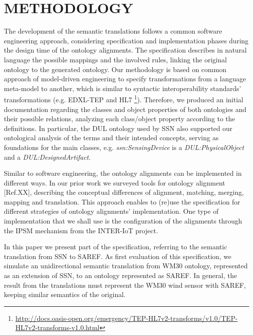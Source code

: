 \documentclass{sig-alternate-05-2015}
\begin{document}
\section{METHODOLOGY}
The development of the semantic translations follows a common software engineering approach, considering specification and implementation phases during the design time of the ontology alignments. The specification describes in natural language the possible mappings and the involved rules, linking the original ontology to the generated ontology. Our methodology is based on common approach of model-driven engineering to specify transformations from a language meta-model to another, which is similar to syntactic interoperability standards' transformations (e.g. EDXL-TEP and HL7 \footnote{\url{http://docs.oasis-open.org/emergency/TEP-HL7v2-transforms/v1.0/TEP-HL7v2-transforms-v1.0.html}}). Therefore, we produced an initial documentation regarding the classes and object properties of both ontologies and their possible relations, analyzing each class/object property according to the definitions. In particular, the DUL ontology used by SSN also supported our ontological analysis of the terms and their intended concepts, serving as foundations for the main classes, e.g. \textit{ssn:SensingDevice} is a \textit{DUL:PhysicalObject} and a \textit{DUL:DesignedArtifact}.

Similar to software engineering, the ontology alignments can be implemented in different ways. In our prior work we surveyed tools for ontology alignment [Ref.XX], describing the conceptual differences of alignment, matching, merging, mapping and translation. This approach enables to (re)use the specification for different strategies of ontology alignments’ implementation. One type of implementation that we shall use is the configuration of the alignments through the IPSM mechanism from the INTER-IoT project. 

In this paper we present part of the specification, referring to the semantic translation from SSN to SAREF. As first evaluation of this specification, we simulate an unidirectional semantic translation from WM30 ontology, represented as an extension of SSN, to an ontology represented as SAREF. In general, the result from the translations must represent the WM30 wind sensor with SAREF, keeping similar semantics of the original. 
\end{document}
